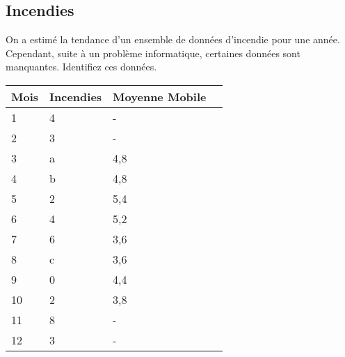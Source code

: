 \clearpage
\subsection{Incendies}

On a estimé la tendance d’un ensemble de données d’incendie pour une
année. Cependant, suite à un problème informatique, certaines données
sont manquantes. Identifiez ces données.\\

\begin{tabular}{|l|l|l|l|}
  \hline
  \multicolumn{1}{|l|}{Mois} & \multicolumn{1}{l|}{Incendies} & \multicolumn{1}{l|}{Moyenne Mobile} &  \\ \hline
  1 & 4 & \multicolumn{1}{l|}{-} &  \\ \hline
  2 & 3 & \multicolumn{1}{l|}{-} &  \\ \hline
  3 & \multicolumn{1}{l|}{a} & 4,8 &  \\ \hline
  4 & \multicolumn{1}{l|}{b} & 4,8 &  \\ \hline
  5 & 2 & 5,4 &  \\ \hline
  6 & 4 & 5,2 &  \\ \hline
  7 & 6 & 3,6 &  \\ \hline
  8 & \multicolumn{1}{l|}{c} & 3,6 &  \\ \hline
  9 & \multicolumn{1}{l|}{0} & 4,4 &  \\ \hline
  10 & 2 & 3,8 &  \\ \hline
  11 & 8 & \multicolumn{1}{l|}{-} &  \\ \hline
  12 & 3 & \multicolumn{1}{l|}{-} &  \\ \hline
\end{tabular}




